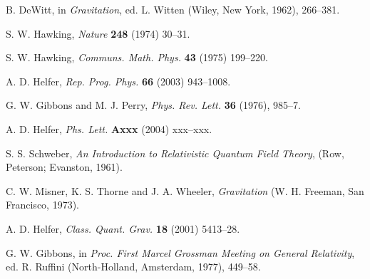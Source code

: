 \documentclass[12pt]{article}
\begin{document}
\begin{thebibliography}{99}

%

B. DeWitt, in {\em Gravitation}, ed. L. Witten
(Wiley, New York, 1962), 266--381.


S. W. Hawking, {\em Nature} {\bf 248} (1974) 30--31. 


S. W. Hawking, {\em Communs. Math. Phys.} {\bf 43} (1975) 199--220.

A. D. Helfer, {\em Rep. Prog. Phys.} {\bf 66} (2003) 943--1008.

G. W. Gibbons and M. J. Perry, {\em Phys. Rev. Lett.} {\bf 36} (1976),
985--7.

A. D. Helfer, {\em Phs. Lett.} {\bf Axxx} (2004) xxx--xxx. 

S. S. Schweber, {\em An Introduction to Relativistic
Quantum Field Theory}, 
(Row, Peterson; Evanston, 1961).

C. W. Misner, K. S. Thorne and J. A. Wheeler, {\em Gravitation}
(W. H. Freeman, San Francisco, 1973).

A. D. Helfer, {\em Class. Quant. Grav.} {\bf 18} (2001) 5413--28.

G. W. Gibbons, in {\em Proc. First
Marcel Grossman Meeting on General Relativity}, ed.
R. Ruffini (North-Holland, Amsterdam, 1977), 
449--58.


\end{thebibliography}
\end{document}
